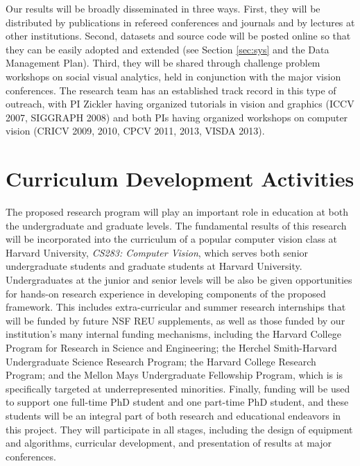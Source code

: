 Our results will be broadly disseminated in three ways. First, they will be distributed by publications in refereed conferences and journals and by lectures at other institutions. Second, datasets and source code will be posted online so that they can be easily adopted and extended (see Section \ref{sec:sys} and the Data Management Plan). Third, they will be shared through challenge problem workshops on social visual analytics, held in conjunction with the major vision conferences. The research team has an established track record in this type of outreach, with PI Zickler having organized tutorials in vision and graphics (ICCV 2007, SIGGRAPH 2008) and both PIs having organized workshops on computer vision (CRICV 2009, 2010, CPCV 2011, 2013, VISDA 2013).

\vspace{-8pt}
\section{Curriculum Development Activities}
\label{sec:curriculum}
\vspace{-8pt}
The proposed research program will play an important role in education at both the undergraduate and graduate levels. The fundamental results of this research will be incorporated into the curriculum of a popular computer vision class at Harvard University, \emph{CS283: Computer Vision}, which serves both senior undergraduate students and graduate students at Harvard University. Undergraduates at the junior and senior levels will be also be given opportunities for hands-on research experience in developing components of the proposed framework. This includes extra-curricular and summer research internships that will be funded by future NSF REU supplements, as well as those funded by our institution's many internal funding mechanisms, including the Harvard College Program for Research in Science and Engineering; the Herchel Smith-Harvard Undergraduate Science Research Program; the Harvard College Research Program; and the Mellon Mays Undergraduate Fellowship Program, which is is specifically targeted at underrepresented minorities. Finally, funding will be used to support one full-time PhD student and one part-time PhD student, and these students will be an integral part of both research and educational endeavors in this project. They will participate in all stages, including the design of equipment and algorithms, curricular development, and presentation of results at major conferences.

